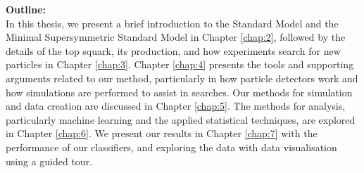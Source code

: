 \newpage
\noindent\textbf{Outline:}\\
In this thesis, we present a brief introduction to the Standard Model and the Minimal Supersymmetric Standard Model in Chapter \ref{chap:2}, followed by the details of the top squark, its production, and how experiments search for new particles in Chapter \ref{chap:3}. Chapter \ref{chap:4} presents the tools and supporting arguments related to our method, particularly in how particle detectors work and how simulations are performed to assist in searches. Our methods for simulation and data creation are discussed in Chapter \ref{chap:5}. The methods for analysis, particularly machine learning and the applied statistical techniques, are explored in Chapter \ref{chap:6}. We present our results in Chapter \ref{chap:7} with the performance of our classifiers, and exploring the data with data visualisation using a guided tour.